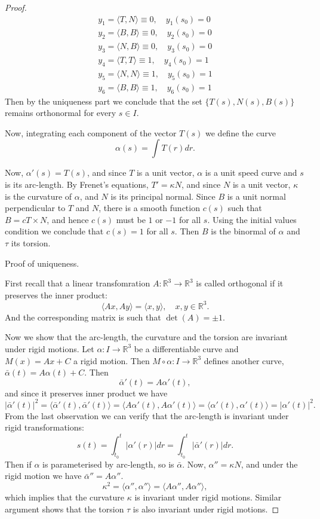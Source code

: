 \documentclass{amsart}
\begin{document}
\begin{proof}
\begin{equation}
\begin{split}
y_1 = \langle T, N \rangle \equiv 0, \quad y_1 (s_0)= 0\\
y_2 = \langle B, B \rangle \equiv 0, \quad y_2 (s_0)= 0 \\
y_3 = \langle N, B \rangle \equiv 0, \quad y_3 (s_0)= 0 \\
y_4 = \langle T, T \rangle \equiv 1, \quad y_4 (s_0)= 1 \\
y_5 = \langle N, N \rangle \equiv 1, \quad y_5 (s_0)= 1 \\
y_6 = \langle B, B \rangle \equiv 1, \quad y_6 (s_0)= 1 
\end{split}
\end{equation}
Then by the uniqueness part we conclude that the set \(\{ T(s), N(s), B(s) \}\) remains orthonormal for every \(s\in I\).

Now, integrating each component of the vector \(T(s)\) we define the curve 
\[
\alpha(s) = \int T(r) dr. \]

Now, \(\alpha'(s) = T(s)\), and since \(T\) is a unit vector, \(\alpha\) is a unit speed curve and \(s\) is its arc-length. By Frenet's equations, \(T' = \kappa N\), and since \(N\) is a unit vector, \(\kappa\) is the curvature of \(\alpha\), and 
\(N\) is its principal normal. Since \(B\) is a unit normal perpendicular to \(T\) and \(N\), there is a smooth function  \(c(s)\) such that \(B = c T\times N\), and hence \(c(s)\) must be \(1\) or \(-1\) for all \(s\). Using the initial values condition we conclude that \(c(s) = 1\) for all \(s\). Then \(B\) is the binormal of \(\alpha\) and \(\tau\) its torsion.

Proof of uniqueness.

First recall that a linear transfomration \(A: \mathbb{R}^3 \to \mathbb{R}^3\) is called orthogonal if it preserves the inner product:
\[ \langle Ax, Ay \rangle = \langle x, y \rangle,\quad x,y\in\mathbb{R}^3. \]
And the corresponding matrix is such that \(\det(A) = \pm 1\).

Now we show that the arc-length, the curvature and the torsion are invariant under rigid motions.
Let \(\alpha:I\to\mathbb{R}^3\) be a differentiable curve and \(M(x) = Ax + C\) a rigid motion. Then \(M \circ \alpha : I \to \mathbb{R}^3\) defines another curve, \(\bar{\alpha} (t) = A\alpha(t) + C\). Then
\[ \bar{\alpha}'(t) = A\alpha'(t), \]
and since it preserves inner product we have
\[ |\bar{\alpha}'(t)|^2  = \langle \bar{\alpha}'(t), \bar{\alpha}'(t) \rangle = \langle A\alpha'(t), A\alpha'(t)\rangle = \langle \alpha'(t) , \alpha'(t) \rangle = |\alpha'(t)|^2. \]
From the last observation we can verify that the arc-length is invariant under rigid transformations:
\[ s(t) = \int_{t_0}^{t} |\alpha'(r)| dr = \int_{t_0}^{t} |\bar{\alpha}'(r)| dr. \]
Then if \(\alpha\) is parameterised by arc-length, so is \(\bar{\alpha}\). Now, \(\alpha'' = \kappa N\), and under the rigid motion we have \(\bar{\alpha}'' = A\alpha''\). 
\[ \kappa^2 = \langle \alpha'',\alpha''\rangle = \langle A\alpha'',A\alpha''\rangle, \]
which implies that the curvature \(\kappa\) is
invariant under rigid motions. Similar argument shows that the torsion \(\tau\) is also invariant under rigid motions.


\end{proof}
\end{document}
